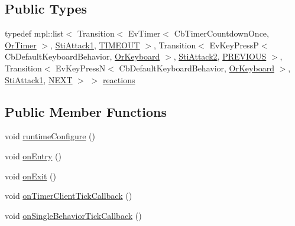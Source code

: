 \subsection*{Public Types}
\begin{DoxyCompactItemize}
\item 
typedef mpl\+::list$<$ Transition$<$ Ev\+Timer$<$ Cb\+Timer\+Countdown\+Once, \hyperlink{classsm__starcraft__ai_1_1OrTimer}{Or\+Timer} $>$, \hyperlink{structsm__starcraft__ai_1_1attack__inner__states_1_1StiAttack1}{Sti\+Attack1}, \hyperlink{structsm__starcraft__ai_1_1attack__inner__states_1_1StiAttack3_1_1TIMEOUT}{T\+I\+M\+E\+O\+UT} $>$, Transition$<$ Ev\+Key\+PressP$<$ Cb\+Default\+Keyboard\+Behavior, \hyperlink{classsm__starcraft__ai_1_1OrKeyboard}{Or\+Keyboard} $>$, \hyperlink{structsm__starcraft__ai_1_1attack__inner__states_1_1StiAttack2}{Sti\+Attack2}, \hyperlink{structsm__starcraft__ai_1_1attack__inner__states_1_1StiAttack3_1_1PREVIOUS}{P\+R\+E\+V\+I\+O\+US} $>$, Transition$<$ Ev\+Key\+PressN$<$ Cb\+Default\+Keyboard\+Behavior, \hyperlink{classsm__starcraft__ai_1_1OrKeyboard}{Or\+Keyboard} $>$, \hyperlink{structsm__starcraft__ai_1_1attack__inner__states_1_1StiAttack1}{Sti\+Attack1}, \hyperlink{structsm__starcraft__ai_1_1attack__inner__states_1_1StiAttack3_1_1NEXT}{N\+E\+XT} $>$ $>$ \hyperlink{structsm__starcraft__ai_1_1attack__inner__states_1_1StiAttack3_acebef7eb53f0bacb5a6be79fdd61c831}{reactions}
\end{DoxyCompactItemize}
\subsection*{Public Member Functions}
\begin{DoxyCompactItemize}
\item 
void \hyperlink{structsm__starcraft__ai_1_1attack__inner__states_1_1StiAttack3_a540d7311712db7ce0310910de4b5cc31}{runtime\+Configure} ()
\item 
void \hyperlink{structsm__starcraft__ai_1_1attack__inner__states_1_1StiAttack3_a9550a513b642e65826a76da9d6c3df58}{on\+Entry} ()
\item 
void \hyperlink{structsm__starcraft__ai_1_1attack__inner__states_1_1StiAttack3_a67f4c0bdbe9471499df43482639317e8}{on\+Exit} ()
\item 
void \hyperlink{structsm__starcraft__ai_1_1attack__inner__states_1_1StiAttack3_afb25dc151281ba1422efe43a7d9e57d7}{on\+Timer\+Client\+Tick\+Callback} ()
\item 
void \hyperlink{structsm__starcraft__ai_1_1attack__inner__states_1_1StiAttack3_a22b5a550554194df779a60d68b101311}{on\+Single\+Behavior\+Tick\+Callback} ()
\end{DoxyCompactItemize}
